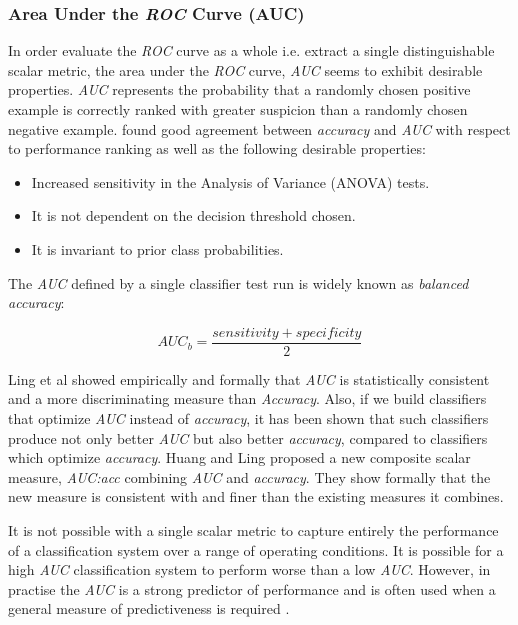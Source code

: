 \documentclass[10pt]{unbthesis}
\begin{document}
\subsubsection{Area Under the \textit{ROC} Curve (AUC)}
In order evaluate the \textit{ROC} curve as a whole i.e. extract a
single distinguishable scalar metric, the area under the \textit{ROC}
curve, \textit{AUC} seems to exhibit desirable
properties. \textit{AUC} represents the probability that a randomly
chosen positive example is correctly ranked with greater suspicion
than a randomly chosen negative example. \cite{RefWorks:32} found good
agreement between \textit{accuracy} and \textit{AUC} with respect to
performance ranking as well as the following desirable properties:

\begin{itemize}
\item Increased sensitivity in the Analysis of Variance (ANOVA) tests.
\item It is not dependent on the decision threshold chosen.
\item It is invariant to prior class probabilities.
\end{itemize}

The \textit{AUC} defined by a single classifier test run is widely
known as \textit{balanced accuracy}:

\begin{equation}
  AUC_b = \frac{sensitivity + specificity}{2}
\end{equation}

Ling et al \cite{RefWorks:56} showed empirically and formally that
\textit{AUC} is statistically consistent and a more discriminating measure
than \textit{Accuracy}. Also, if we build classifiers that optimize
\textit{AUC} instead of \textit{accuracy}, it has been shown
\cite{RefWorks:62} that such classifiers produce not only better
\textit{AUC} but also better \textit{accuracy}, compared to
classifiers which optimize \textit{accuracy}. Huang and Ling
\cite{RefWorks:42} proposed a new composite scalar measure,
\textit{AUC:acc} combining \textit{AUC} and \textit{accuracy}. They
show formally that the new measure is consistent with and finer than
the existing measures it combines.

It is not possible with a single scalar metric to capture
entirely the performance of a classification system over a range of
operating conditions. It is possible for a high \textit{AUC}
classification system to perform worse than a low
\textit{AUC}. However, in practise the \textit{AUC} is a strong
predictor of performance and is often used when a general measure of
predictiveness is required \cite{RefWorks:39}.
\end{document}
